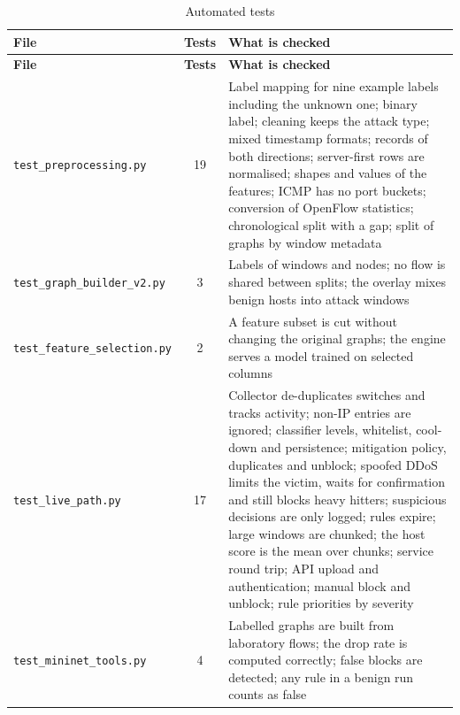 \begin{longtable}{|p{4.0cm}|c|p{8.4cm}|}
\caption{Automated tests}\label{tab:tests}\\
\hline
\textbf{File} & \textbf{Tests} & \textbf{What is checked} \\ \hline
\endfirsthead
\hline \textbf{File} & \textbf{Tests} & \textbf{What is checked} \\ \hline
\endhead
\texttt{test\_preprocessing.py} & 19 & Label mapping for nine example labels including the unknown one; binary label; cleaning keeps the attack type; mixed timestamp formats; records of both directions; server-first rows are normalised; shapes and values of the features; ICMP has no port buckets; conversion of OpenFlow statistics; chronological split with a gap; split of graphs by window metadata \\ \hline
\texttt{test\_graph\_builder\_v2.py} & 3 & Labels of windows and nodes; no flow is shared between splits; the overlay mixes benign hosts into attack windows \\ \hline
\texttt{test\_feature\_selection.py} & 2 & A feature subset is cut without changing the original graphs; the engine serves a model trained on selected columns \\ \hline
\texttt{test\_live\_path.py} & 17 & Collector de-duplicates switches and tracks activity; non-IP entries are ignored; classifier levels, whitelist, cool-down and persistence; mitigation policy, duplicates and unblock; spoofed DDoS limits the victim, waits for confirmation and still blocks heavy hitters; suspicious decisions are only logged; rules expire; large windows are chunked; the host score is the mean over chunks; service round trip; API upload and authentication; manual block and unblock; rule priorities by severity \\ \hline
\texttt{test\_mininet\_tools.py} & 4 & Labelled graphs are built from laboratory flows; the drop rate is computed correctly; false blocks are detected; any rule in a benign run counts as false \\ \hline
\end{longtable}
